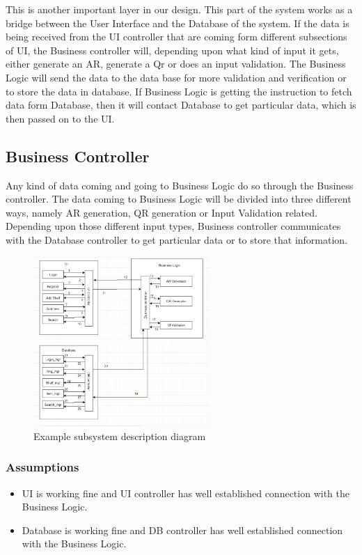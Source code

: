 
This is another important layer in our design. This part of the system works as a bridge between the User Interface and the Database of the system. If the data is being received from the UI controller that are coming form different subsections of UI, the Business controller will, depending upon what kind of input it gets, either generate an AR, generate a Qr or does an input validation. The Business Logic will send the data to the data base for more validation and verification or to store the data in database. If Business Logic is getting the instruction to fetch data form Database, then it will contact Database to get particular data, which is then passed on to the UI.

\subsection{Business Controller}
Any kind of data coming and going to Business Logic do so through the Business controller. The data coming to Business Logic will be divided into three different ways, namely AR generation, QR generation or Input Validation related. Depending upon those different input types, Business controller communicates with the Database controller to get particular data or to store that information.

\begin{figure}[h!]
	\centering
 	\includegraphics[width=0.60\textwidth]{images/captureBusiness}
 \caption{Example subsystem description diagram}
\end{figure}

\subsubsection{Assumptions}

\begin{itemize}
    
    \item UI is working fine and UI controller has well established connection with the Business Logic.
    \item Database is working fine and DB controller has well established connection with the Business Logic.
\end{itemize}

